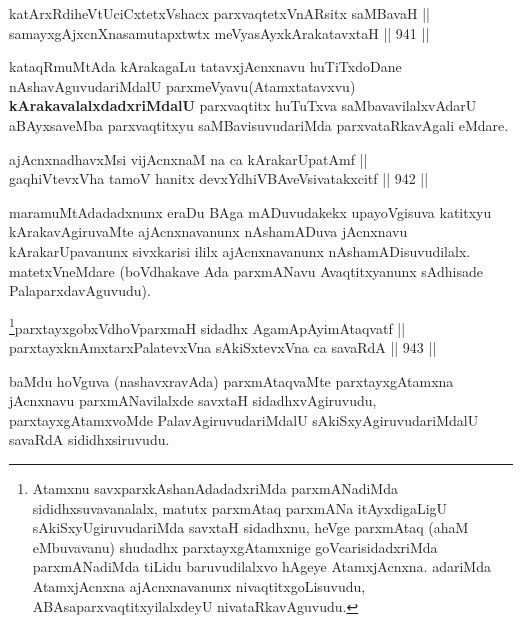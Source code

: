 \begin{shl}
katArxRdiheVtUciCxtetxVshacx parxvaqtetxVnARsitx saMBavaH || \\
samayxgAjxcnXnasamutapxtwtx meVyasAyxkArakatavxtaH \hfill || 941 ||  
\end{shl}

\begin{artha}
kataqRmuMtAda kArakagaLu tatavxjAcnxnavu huTiTxdoDane nAshavAguvudariMdalU parxmeVyavu(Atamxtatavxvu) \textbf{kArakavalalxdadxriMdalU} parxvaqtitx huTuTxva saMbavavilalxvAdarU aBAyxsaveMba parxvaqtitxyu saMBavisuvudariMda parxvataRkavAgali eMdare.
\end{artha}

\begin{shl}
ajAcnxnadhavxMsi vijAcnxnaM na ca kArakarUpatAmf || \\
gaqhiVtevxVha tamoV hanitx devxYdhiVBAveV\s sivatakxcitf \hfill || 942 ||  
\end{shl}

\begin{artha}
maramuMtAdadadxnunx eraDu BAga mADuvudakekx upayoVgisuva katitxyu kArakavAgiruvaMte ajAcnxnavanunx nAshamADuva jAcnxnavu kArakarUpavanunx sivxkarisi ililx ajAcnxnavanunx nAshamADisuvudilalx. matetxVneMdare (boVdhakave Ada parxmANavu Avaqtitxyanunx sAdhisade PalaparxdavAguvudu).
\end{artha}


\begin{shl}
\footnote{Atamxnu savxparxkAshanAdadadxriMda parxmANadiMda sididhxsuvavanalalx, matutx parxmAtaq parxmANa itAyxdigaLigU sAkiSxyUgiruvudariMda savxtaH sidadhxnu, heVge parxmAtaq (ahaM eMbuvavanu) shudadhx parxtayxgAtamxnige goVcarisidadxriMda parxmANadiMda  tiLidu baruvudilalxvo hAgeye AtamxjAcnxna. adariMda AtamxjAcnxna ajAcnxnavanunx nivaqtitxgoLisuvudu, ABAsaparxvaqtitxyilalxdeyU nivataRkavAguvudu.}parxtayxgobxVdhoV\s parxmaH sidadhx AgamApAyimAtaqvatf || \\
parxtayxknAmxtarxPalatevxVna sAkiSxtevxVna ca savaRdA \hfill || 943 ||  
\end{shl}

\begin{artha}
baMdu hoVguva (nashavxravAda) parxmAtaqvaMte parxtayxgAtamxna jAcnxnavu parxmANavilalxde savxtaH sidadhxvAgiruvudu, parxtayxgAtamxvoMde PalavAgiruvudariMdalU sAkiSxyAgiruvudariMdalU savaRdA sididhxsiruvudu.
\end{artha}


